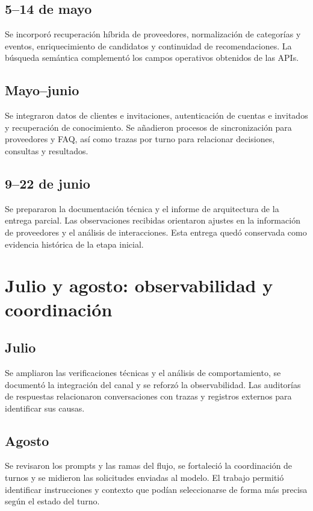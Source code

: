 \documentclass[
	a4paper,
	12pt,
]{CSSullivanBusinessReport}
\begin{document}
\subsection*{5--14 de mayo}
Se incorporó recuperación híbrida de proveedores, normalización de categorías y eventos, enriquecimiento de candidatos y continuidad de recomendaciones. La búsqueda semántica complementó los campos operativos obtenidos de las APIs.

\subsection*{Mayo--junio}
Se integraron datos de clientes e invitaciones, autenticación de cuentas e invitados y recuperación de conocimiento. Se añadieron procesos de sincronización para proveedores y FAQ, así como trazas por turno para relacionar decisiones, consultas y resultados.

\subsection*{9--22 de junio}
Se prepararon la documentación técnica y el informe de arquitectura de la entrega parcial. Las observaciones recibidas orientaron ajustes en la información de proveedores y el análisis de interacciones. Esta entrega quedó conservada como evidencia histórica de la etapa inicial.

\section{Julio y agosto: observabilidad y coordinación}
\subsection*{Julio}
Se ampliaron las verificaciones técnicas y el análisis de comportamiento, se documentó la integración del canal y se reforzó la observabilidad. Las auditorías de respuestas relacionaron conversaciones con trazas y registros externos para identificar sus causas.

\subsection*{Agosto}
Se revisaron los prompts y las ramas del flujo, se fortaleció la coordinación de turnos y se midieron las solicitudes enviadas al modelo. El trabajo permitió identificar instrucciones y contexto que podían seleccionarse de forma más precisa según el estado del turno.
\end{document}
